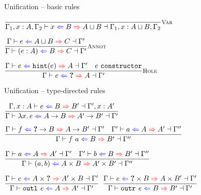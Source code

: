 \documentclass{beamer}
\begin{document}
\begin{frame}{Unification -- basic rules}

\begin{center}
  $\infrule[Var]{}{\uniftyping[\Gamma_1, x : A, \Gamma_2]{x}{B}{\hintlub{A}{B}}[\Gamma_1, x : \hintlub{A}{B}, \Gamma_2]}$

  \vspace{2em}

  $\infrule[Annot]{\uniftyping{e}{\hintlub{A}{B}}{C}}{\uniftyping{\annot{e}{A}}{B}{C}}$

  \vspace{2em}

  $\infrule[Hole]{\uniftyping{e}{\hintfor{e}}{A} \quad \sidecond{e\ \texttt{constructor}}}{\uniftyping{e}{\Hole}{A}}$
\end{center}

\end{frame}

\begin{frame}{Unification -- type-directed rules}

\begin{center}
  $\infrule{\uniftyping[\extend{\Gamma}{x}{A}]{e}{B}{B'}[\extend{\Gamma'}{x}{A'}]}{\uniftyping{\fun{x}{e}}{\Fun{A}{B}}{\Fun{A'}{B'}}}$

  \vspace{2em}

  $\infrule{\uniftyping[\Gamma]{f}{\Fun{\Hole}{B}}{\Fun{A}{B'}}[\Gamma'] \quad \uniftyping[\Gamma']{a}{A}{A'}[\Gamma'']}{\uniftyping[\Gamma]{\app{f}{a}}{B}{B'}[\Gamma'']}$

  \vspace{2em}

  $\infrule{\uniftyping[\Gamma]{a}{A}{A'}[\Gamma'] \quad \uniftyping[\Gamma']{b}{B}{B'}[\Gamma'']}{\uniftyping[\Gamma]{\pair{a}{b}}{\Prod{A}{B}}{\Prod{A'}{B'}}[\Gamma'']}$

  \vspace{2em}

  $\infrule{\uniftyping{e}{\Prod{A}{\Hole}}{\Prod{A'}{B}}}{\uniftyping{\outl{e}}{A}{A'}}$
  \quad
  $\infrule{\uniftyping{e}{\Prod{\Hole}{B}}{\Prod{A}{B'}}}{\uniftyping{\outr{e}}{B}{B'}}$
\end{center}

\end{frame}
\end{document}
